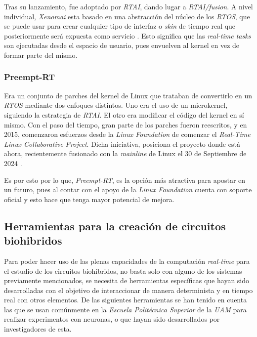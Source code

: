 Tras su lanzamiento, fue adoptado por \textit{RTAI}, dando lugar a \textit{RTAI/fusion}. A nivel individual, \textit{Xenomai} esta basado en una abstracción del núcleo de los \textit{RTOS}, que se puede usar para crear cualquier tipo de interfaz o \textit{skin} de tiempo real que posteriormente será expuesta como servicio \cite{DENXTeam2021}. Esto significa que las \textit{real-time tasks} son ejecutadas desde el espacio de usuario, pues envuelven al kernel en vez de formar parte del mismo.


\subsubsection{Preempt-RT\label{SSS:PTREEMPTRT}}


Era un conjunto de parches del kernel de Linux que trataban de convertirlo en un \textit{RTOS} mediante dos enfoques distintos. Uno era el uso de un microkernel, siguiendo la estrategia de \textit{RTAI}. El otro era modificar el código del kernel en sí mismo. Con el paso del tiempo, gran parte de los parches fueron reescritos, y en 2015, comenzaron esfuerzos desde la \textit{Linux Foundation} de comenzar el \textit{Real-Time Linux Collaborative Project}. Dicha iniciativa, posiciona el proyecto donde está ahora, recientemente fusionado con la \textit{mainline} de Linux el 30 de Septiembre de 2024 \cite{RTLdeveloperteam2022, RTLdeveloperteam2024}.

Es por esto por lo que, \textit{Preempt-RT}, es la opción más atractiva para apostar en un futuro, pues al contar con el apoyo de la \textit{Linux Foundation} cuenta con soporte oficial y esto hace que tenga mayor potencial de mejora.


\subsection{Herramientas para la creación de circuitos biohibridos\label{SS:HERRAMIENTAS}}


Para poder hacer uso de las plenas capacidades de la computación \textit{real-time} para el estudio de los circuitos biohíbridos, no basta solo con alguno de los sistemas previamente mencionados, se necesita de herramientas específicas que hayan sido desarrolladas con el objetivo de interaccionar de manera determinista y en tiempo real con otros elementos. De las siguientes herramientas se han tenido en cuenta las que se usan comúnmente en la \textit{Escuela Politécnica Superior} de la \textit{UAM} para realizar experimentos con neuronas, o que hayan sido desarrollados por investigadores de esta.



